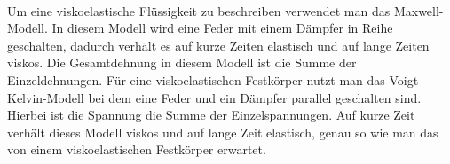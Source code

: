 \documentclass[11pt,a4paper]{article}
\numberwithin{equation}{section}
\numberwithin{figure}{section}
\begin{document}
\\
\begin{addmargin}[25pt]{0pt}
Um eine viskoelastische Flüssigkeit zu beschreiben verwendet man das Maxwell-Modell. In diesem Modell wird eine Feder mit einem Dämpfer in Reihe geschalten, dadurch verhält es auf kurze Zeiten elastisch und auf lange Zeiten viskos. Die Gesamtdehnung in diesem Modell ist die Summe der Einzeldehnungen. Für eine viskoelastischen Festkörper nutzt man das Voigt-Kelvin-Modell bei dem eine Feder und ein Dämpfer parallel geschalten sind. Hierbei ist die Spannung die Summe der Einzelspannungen. Auf kurze Zeit verhält dieses Modell viskos und auf lange Zeit elastisch, genau so wie man das von einem viskoelastischen Festkörper erwartet.\\
\end{addmargin}
\end{document}
